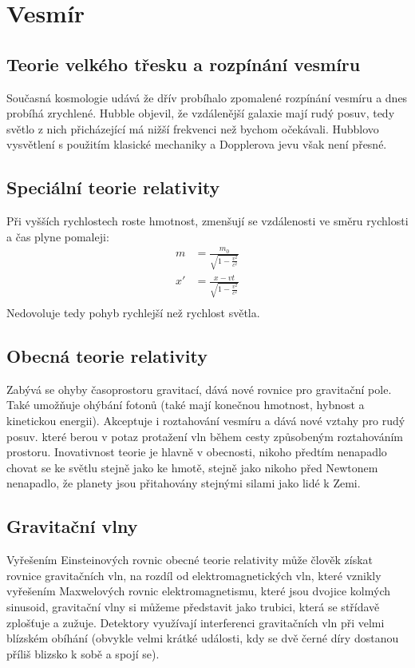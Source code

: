 \documentclass[titlepage]{report}
\begin{document}
\chapter{Vesmír}
\section{Teorie velkého třesku a rozpínání vesmíru}
Současná kosmologie udává že dřív probíhalo zpomalené rozpínání vesmíru a dnes probíhá zrychlené. Hubble objevil, že vzdálenější galaxie mají rudý posuv, tedy světlo z nich přicházející má nižší frekvenci než bychom očekávali. Hubblovo vysvětlení s použitím klasické mechaniky a Dopplerova jevu však není přesné.
\section{Speciální teorie relativity}
Při vyšších rychlostech roste hmotnost, zmenšují se vzdálenosti ve směru rychlosti a čas plyne pomaleji:\\
\begin{align}
m &= \frac{m_0}{\sqrt{1 - \frac{v^2}{c^2}}}\\
x' &= \frac{x - vt}{\sqrt{1 - \frac{v^2}{c^2}}}\\
\end{align}
Nedovoluje tedy pohyb rychlejší než rychlost světla.
\section{Obecná teorie relativity}
Zabývá se ohyby časoprostoru gravitací, dává nové rovnice pro gravitační pole. Také umožňuje ohýbání fotonů (také mají konečnou hmotnost, hybnost a kinetickou energii). Akceptuje i roztahování vesmíru a dává nové vztahy pro rudý posuv. které berou v potaz protažení vln během cesty způsobeným roztahováním prostoru. Inovativnost teorie je hlavně v obecnosti, nikoho předtím nenapadlo chovat se ke světlu stejně jako ke hmotě, stejně jako nikoho před Newtonem nenapadlo, že planety jsou přitahovány stejnými silami jako lidé k Zemi.
\section{Gravitační vlny}
Vyřešením Einsteinových rovnic obecné teorie relativity může člověk získat rovnice gravitačních vln, na rozdíl od elektromagnetických vln, které vznikly vyřešením Maxwelových rovnic elektromagnetismu, které jsou dvojice kolmých sinusoid, gravitační vlny si můžeme představit jako trubici, která se střídavě zplošťuje a zužuje. Detektory využívají interferenci gravitačních vln při velmi blízském obíhání (obvykle velmi krátké události, kdy se dvě černé díry dostanou příliš blizsko k sobě a spojí se).
\end{document}
